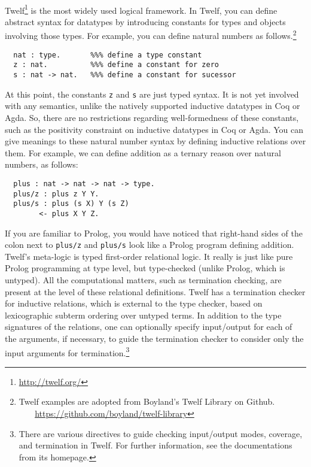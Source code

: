 \paragraph{}
Twelf\footnote{\url{http://twelf.org/}} is the most widely used
logical framework. In Twelf, you can define abstract syntax for datatypes
by introducing constants for types and objects involving those types.
For example, you can define natural numbers as follows.\footnote{
	Twelf examples are adopted from Boyland's Twelf Library on Github.\\
	$~~~~~~~$
	\url{https://github.com/boyland/twelf-library}}\vspace*{-2em}
\begin{singlespace}
\begin{verbatim}
  nat : type.       %%% define a type constant
  z : nat.          %%% define a constant for zero
  s : nat -> nat.   %%% define a constant for sucessor
\end{verbatim}
\end{singlespace}\noindent
At this point, the constants \texttt{z} and \texttt{s} are just typed syntax.
It is not yet involved with any semantics, unlike the natively supported
inductive datatypes in Coq or Agda. So, there are no restrictions regarding
well-formedness of these constants, such as the positivity constraint on
inductive datatypes in Coq or Agda.
You can give meanings to these natural number syntax by defining
inductive relations over them. For example, we can define addition
as a ternary reason over natural numbers, as follows:\vspace*{-2em}
\begin{singlespace}
\begin{verbatim}
  plus : nat -> nat -> nat -> type.
  plus/z : plus z Y Y.
  plus/s : plus (s X) Y (s Z)
        <- plus X Y Z.
\end{verbatim}
\end{singlespace}\noindent
If you are familiar to Prolog, you would have noticed that
right-hand sides of the colon next to \verb|plus/z| and \verb|plus/s|
look like a Prolog program defining addition. Twelf's meta-logic
is typed first-order relational logic.  It really is just
like pure Prolog programming at type level, but type-checked
(unlike Prolog, which is untyped). All the computational matters,
such as termination checking, are present at the level of these
relational definitions. Twelf has a termination checker
for inductive relations, which is external to the type checker,
based on lexicographic subterm ordering over untyped terms.
In addition to the type signatures of the relations, one can optionally specify
input/output for each of the arguments, if necessary, to guide
the termination checker to consider only the input arguments
for termination.\footnote{There are various directives to guide
	checking input/output modes, coverage, and termination in Twelf.
	For further information, see the  documentations from its homepage.}


